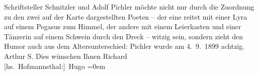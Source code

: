 \begin{ledgroupsized}[t]{13cm}
{{{                  Schriftsteller Schnitzler und Adolf Pichler möchte nicht nur durch die
                  Zuordnung zu den zwei auf der Karte dargestellten Poeten – der eine reitet mit
                  einer Lyra auf einem Pegasus zum Himmel, der andere mit einem Leierkasten und
                  einer Tänzerin auf einem Schwein durch den Dreck – witzig sein, sondern zieht den
                  Humor auch aus dem Altersunterschied: Pichler wurde am 4. 9. 1899 achtzig.}}}\label{K_L00978_1h}\hspace*{2.5em} Arthur S.\pend
           \pstart
           Dies wünschen Ihnen\pend
           \pstart
           \spacefill\mbox{Richard}{\\[\baselineskip]}\spacefill\mbox{{[}hs. Hofmannsthal:{]} Hugo}\pend
           \leftskip=0em{}
         
         \endnumbering{}\end{ledgroupsized}  \newcommand{\dateiname}{L00978}\newcommand{\titel}{Richard Beer-Hofmann und Hugo von Hofmannsthal an Arthur Schnitzler, 19. 9. 1899}\newcommand{\editorInnen}{Martin Anton Müller und Gerd-Hermann Susen}
      